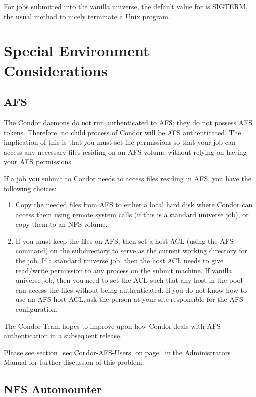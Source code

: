 For jobs submitted into the vanilla universe, the default value for
 is SIGTERM,
the usual method to nicely terminate a Unix program.

\section{Special Environment Considerations}

\subsection{AFS}

The Condor daemons do not run authenticated to AFS; they do not possess
AFS tokens.
Therefore, no child process of Condor will be AFS authenticated.
The implication of this is that you must set file permissions so
that your job can access any necessary files residing on an AFS volume
without relying on having your AFS permissions.

If a job you submit to Condor needs to access files residing in AFS,
you have the following choices:
\begin{enumerate}
\item Copy the needed files from AFS to either a local hard disk where 
Condor can access them using remote system calls (if
this is a standard universe job), or copy them to an NFS volume.
\item If you must keep the files on AFS, then set a host ACL
(using the AFS  command) on the subdirectory to
serve as the current working directory for the job.
If a standard universe job, then the host ACL needs
to give read/write permission to any process on the submit machine.
If vanilla universe job, then you need to set the ACL such that any host 
in the pool can access the files without being authenticated.
If you do not know how to use an AFS host ACL, ask the person at your 
site responsible for the AFS configuration.
\end{enumerate}

The Condor Team hopes to improve upon how Condor deals with AFS 
authentication in a subsequent release.

Please see section~\ref{sec:Condor-AFS-Users} on
page~\pageref{sec:Condor-AFS-Users} in the Administrators Manual for
further discussion of this problem.

\subsection{NFS Automounter}

